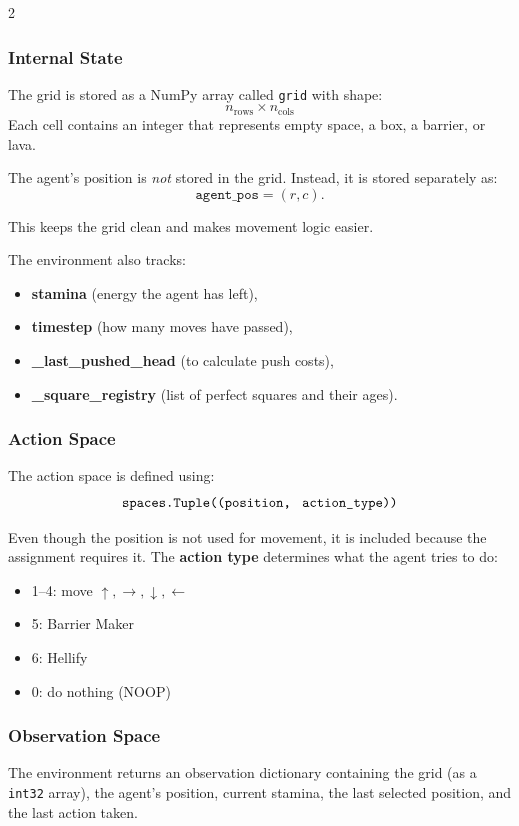 \documentclass[a4paper]{article}
\begin{document}
\begin{multicols}{2}
\subsubsection{Internal State}

The grid is stored as a NumPy array called \texttt{grid} with shape:
\[
n_{\text{rows}} \times n_{\text{cols}}
\]
Each cell contains an integer that represents empty space, a box, a barrier, or lava.

The agent's position is \emph{not} stored in the grid. Instead, it is stored separately as:
\[
\texttt{agent\_pos} = (r, c).
\]

This keeps the grid clean and makes movement logic easier.

The environment also tracks:
\begin{itemize}
    \item \textbf{stamina} (energy the agent has left),
    \item \textbf{timestep} (how many moves have passed),
    \item \textbf{\_last\_pushed\_head} (to calculate push costs),
    \item \textbf{\_square\_registry} (list of perfect squares and their ages).
\end{itemize}

\subsubsection{Action Space}

The action space is defined using:
\[
\texttt{spaces.Tuple((position,\; action\_type))}
\]

Even though the position is not used for movement, it is included because the assignment requires it.  
The \textbf{action type} determines what the agent tries to do:
\begin{itemize}[label=--]
    \item 1–4: move \(\uparrow,\rightarrow,\downarrow,\leftarrow\)
    \item 5: Barrier Maker
    \item 6: Hellify
    \item 0: do nothing (NOOP)
\end{itemize}

\subsubsection{Observation Space}

The environment returns an observation dictionary containing the grid (as a \texttt{int32} array), the agent's position, current stamina, the last selected position, and the last action taken.


\end{multicols}
\end{document}
